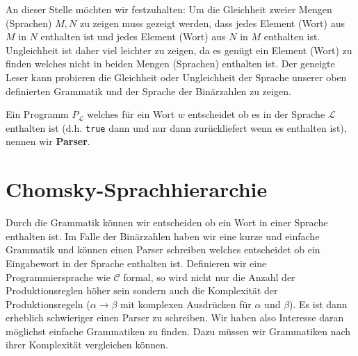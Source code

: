 An dieser Stelle möchten wir festzuhalten: Um die Gleichheit zweier Mengen (Sprachen) $M,N$ zu zeigen muss gezeigt werden, dass jedes Element (Wort) aus $M$ in $N$ enthalten ist
und jedes Element (Wort) aus $N$ in $M$ enthalten ist. Ungleichheit ist daher viel leichter zu zeigen, da es genügt ein Element (Wort) zu finden welches nicht in beiden Mengen (Sprachen) enthalten ist. Der geneigte Leser kann probieren die Gleichheit oder Ungleichheit der Sprache unserer oben definierten Grammatik und der Sprache der Binärzahlen zu zeigen.

\begin{defn}
Ein Programm $P_{\mathcal{L}}$ welches für ein Wort $w$ entscheidet ob es in der Sprache $\mathcal{L}$ enthalten ist (d.h. \verb|true| dann und nur dann zurückliefert wenn es enthalten ist), nennen wir \textbf{Parser}.
\end{defn}

\section{Chomsky-Sprachhierarchie}
Durch die Grammatik können wir entscheiden ob ein Wort in einer Sprache enthalten ist.
Im Falle der Binärzahlen haben wir eine kurze und einfache Grammatik und können einen Parser schreiben
welches entscheidet ob ein Eingabewort in der Sprache enthalten ist.
Definieren wir eine Programmiersprache wie $\mathcal{C}$ formal, so wird nicht nur die Anzahl der Produktionsreglen höher sein
sondern auch die Komplexität der Produktionsregeln ($\alpha \to \beta$ mit komplexen Ausdrücken für $\alpha$ und $\beta$).
Es ist dann erheblich schwieriger einen Parser zu schreiben.
Wir haben also Interesse daran möglichst einfache Grammatiken zu finden. Dazu müssen wir
Grammatiken nach ihrer Komplexität vergleichen können.

